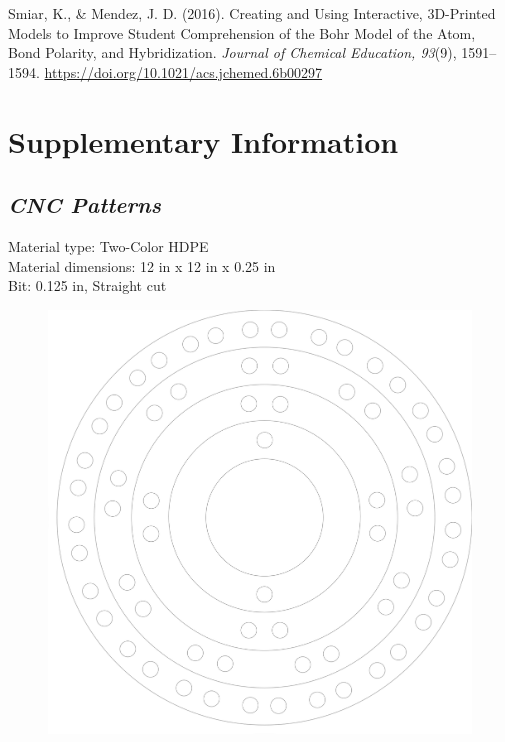 \documentclass[11pt]{sig-alternate}
\begin{document}
\begin{large}
Smiar, K., \& Mendez, J. D. (2016). Creating and Using Interactive, 3D-Printed Models to Improve Student Comprehension of the Bohr Model of the Atom, Bond Polarity, and Hybridization. \textit{Journal of Chemical Education, 93}(9), 1591–1594. \url{https://doi.org/10.1021/acs.jchemed.6b00297}

\newpage

\section*{Supplementary Information}
\subsection*{\textit{CNC Patterns}}

Material type: Two-Color HDPE\\
Material dimensions: 12 in x 12 in x 0.25 in\\
Bit: 0.125 in, Straight cut\\
    \begin{figure}[htp]
        \centering
        \includegraphics[width=15.5cm]{CNC pattern 1.png}
        \label{Image shows a blueprint for creating the 3D Bohr models.}
    \end{figure}


\end{large}
\end{document}
